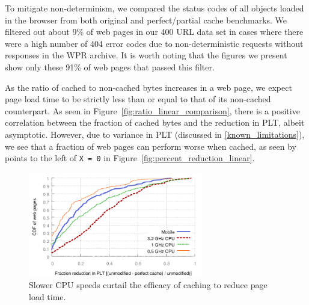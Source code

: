 To mitigate non-determinism, we compared the status codes of all objects loaded in the browser from both original and perfect/partial cache benchmarks. We filtered out about 9\% of web pages in our 400 URL data set in cases where there were a high number of 404 error codes due to non-deterministic requests without responses in the WPR archive. It is worth noting that the figures we present show only these 91\% of web pages that passed this filter.

As the ratio of cached to non-cached bytes increases in a web page, we expect page load time to be strictly less than or equal to that of its non-cached counterpart. As seen in Figure~\ref{fig:ratio_linear_comparison}, there is a positive correlation between the fraction of cached bytes and the reduction in PLT, albeit asymptotic.
However, due to variance in PLT (discussed in \ref{known_limitations}), we see that a fraction of web pages can perform worse when cached, as seen by points to the left of \texttt{X = 0} in Figure~\ref{fig:percent_reduction_linear}.



\begin{figure}[t]
    \includegraphics[width=3in]{../graphs/percent_plt_reduction/percent_reduction_linear_CPU_comparison.pdf}
    \caption[]{\label{fig:plt_cpu_comparison}Slower CPU speeds curtail the efficacy of caching to reduce page load time.}
\end{figure}